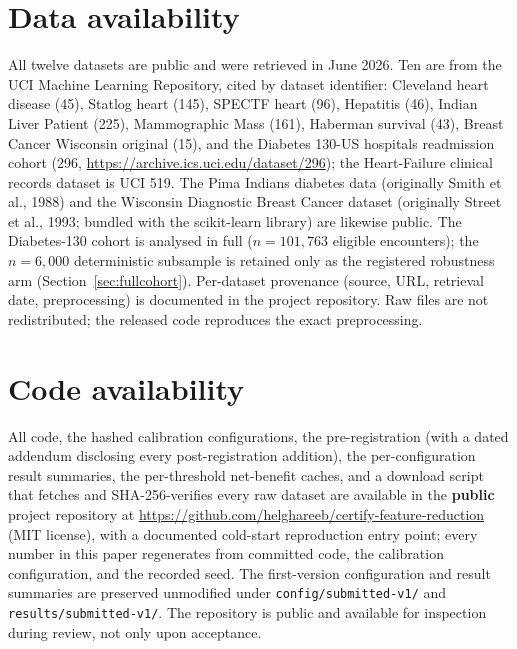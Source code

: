 \documentclass[fleqn,10pt]{wlscirep}
\newcommand{\result}[1]{#1}
\begin{document}
\section*{Data availability}
All twelve datasets are public and were retrieved in June 2026. Ten are from the UCI Machine Learning
Repository, cited by dataset identifier: Cleveland heart disease (45), Statlog heart (145), SPECTF
heart (96), Hepatitis (46), Indian Liver Patient (225), Mammographic Mass (161), Haberman survival
(43), Breast Cancer Wisconsin original (15), and the Diabetes 130-US hospitals readmission cohort
(296, \url{https://archive.ics.uci.edu/dataset/296}); the Heart-Failure clinical records dataset is
UCI 519. The Pima Indians diabetes data (originally Smith et al., 1988) and the Wisconsin Diagnostic
Breast Cancer dataset (originally Street et al., 1993; bundled with the scikit-learn library) are likewise public. The Diabetes-130 cohort is
analysed in full (\result{$n=101{,}763$} eligible encounters); the $n=6{,}000$ deterministic
subsample is retained only as the registered robustness arm
(Section~\ref{sec:fullcohort}). Per-dataset
provenance (source, URL, retrieval date, preprocessing) is documented in the project repository. Raw files are not redistributed; the released code reproduces the exact
preprocessing.

\section*{Code availability}
All code, the hashed calibration configurations, the pre-registration (with a dated addendum
disclosing every post-registration addition), the per-configuration result summaries, the
per-threshold net-benefit caches, and a download script that fetches and SHA-256-verifies every raw
dataset are available in the \textbf{public} project repository at
\url{https://github.com/helghareeb/certify-feature-reduction} (MIT license), with a documented cold-start
reproduction entry point; every number in this paper regenerates from committed code, the
calibration configuration, and the recorded seed. The first-version configuration and result
summaries are preserved unmodified under \texttt{config/submitted-v1/} and
\texttt{results/submitted-v1/}. The repository is public and available for inspection during review,
not only upon acceptance.
\end{document}
